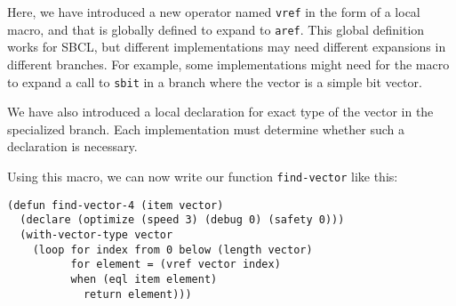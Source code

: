 Here, we have introduced a new operator named \texttt{vref} in the
form of a local macro, and that is globally defined to expand to
\texttt{aref}.  This global definition works for SBCL, but different
implementations may need different expansions in different branches.
For example, some implementations might need for the macro to expand a
call to \texttt{sbit} in a branch where the vector is a simple bit
vector.

We have also introduced a local declaration for exact type of the
vector in the specialized branch.  Each implementation must determine
whether such a declaration is necessary.

Using this macro, we can now write our function \texttt{find-vector}
like this:

{\small\begin{verbatim}
(defun find-vector-4 (item vector)
  (declare (optimize (speed 3) (debug 0) (safety 0)))
  (with-vector-type vector
    (loop for index from 0 below (length vector)
          for element = (vref vector index)
          when (eql item element)
            return element)))
\end{verbatim}}
